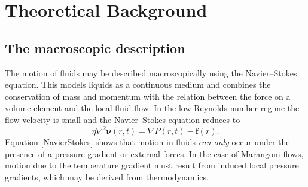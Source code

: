 \section{Theoretical Background}
\subsection{The macroscopic description}\label{Macroscopic}
The motion of fluids may be described macroscopically using the  Navier--Stokes equation.\cite{simpleLiquids} 
This models liquids as a continuous medium and combines the conservation of mass and momentum with the relation between the force on a volume element and the local fluid flow.
In the low Reynolds-number regime the flow velocity is small and the Navier--Stokes equation reduces to
\begin{equation}
\label{NavierStokes}
\eta \nabla^{2}\mathbf{\nu}(r,t) = \nabla P(r,t) - \mathbf{f}(r).
\end{equation}
Equation \ref{NavierStokes} shows that motion in fluids \textit{can only} occur under the presence of a pressure gradient or external forces.
In the case of Marangoni flows, motion due to the temperature gradient must result from induced local pressure gradients, which may be derived from thermodynamics.

